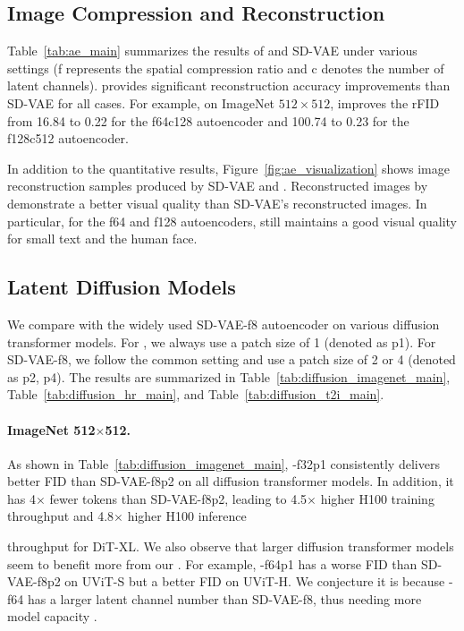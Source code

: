 \subsection{Image Compression and Reconstruction}
Table~\ref{tab:ae_main} summarizes the results of \modelshort and SD-VAE \citep{rombach2022high} under various settings (f represents the spatial compression ratio and c denotes the number of latent channels). \modelshort provides significant reconstruction accuracy improvements than SD-VAE for all cases. For example, on ImageNet $512 \times 512$, \modelshort improves the rFID from 16.84 to 0.22 for the f64c128 autoencoder and 100.74 to 0.23 for the f128c512 autoencoder. 

In addition to the quantitative results, Figure~\ref{fig:ae_visualization} shows image reconstruction samples produced by SD-VAE and \modelshort. Reconstructed images by \modelshort demonstrate a better visual quality than SD-VAE's reconstructed images. In particular, for the f64 and f128 autoencoders,  \modelshort still maintains a good visual quality for small text and the human face. 

\subsection{Latent Diffusion Models}
We compare \modelshort with the widely used SD-VAE-f8 autoencoder \citep{rombach2022high} on various diffusion transformer models. For \modelshort, we always use a patch size of 1 (denoted as p1). For SD-VAE-f8, we follow the common setting and use a patch size of 2 or 4 (denoted as p2, p4). The results are summarized in Table~\ref{tab:diffusion_imagenet_main}, Table~\ref{tab:diffusion_hr_main}, and Table~\ref{tab:diffusion_t2i_main}. 

\vspace{-5pt}
\paragraph{ImageNet 512$\times$512.} As shown in Table~\ref{tab:diffusion_imagenet_main}, \modelshort-f32p1 consistently delivers better FID than SD-VAE-f8p2 on all diffusion transformer models. In addition, it has 4$\times$ fewer tokens than SD-VAE-f8p2, leading to 4.5$\times$ higher H100 training throughput and 4.8$\times$ higher H100 inference 

\!\!\!\! throughput for DiT-XL. We also observe that larger diffusion transformer models seem to benefit more from our \modelshort. For example, \modelshort-f64p1 has a worse FID than SD-VAE-f8p2 on UViT-S but a better FID on UViT-H. We conjecture it is because \modelshort-f64 has a larger latent channel number than SD-VAE-f8, thus needing more model capacity \citep{esser2024scaling}. 

